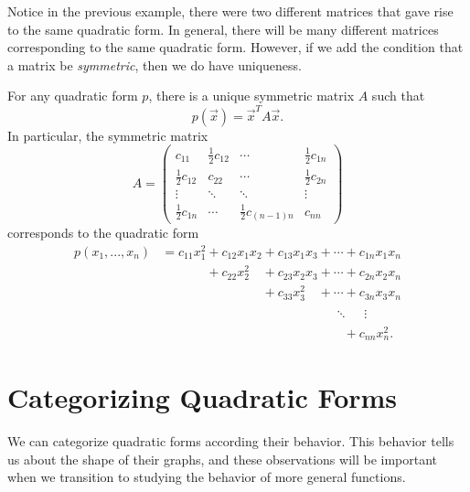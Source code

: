 \documentclass{ximera}
\begin{document}
Notice in the previous example, there were two different matrices that gave rise to the same quadratic form. In general, there will be many different matrices corresponding to the same quadratic form. However, if we add the condition that a matrix be \emph{symmetric}, then we do have uniqueness.

\begin{theorem}
For any quadratic form $p$, there is a unique symmetric matrix $A$ such that
\[
p(\vec{x}) = \vec{x}^T A \vec{x}.
\]
In particular, the symmetric matrix
\[
A = \begin{pmatrix}
c_{11} & \frac{1}{2}c_{12} & \cdots & \frac{1}{2}c_{1n}\\
\frac{1}{2}c_{12} & c_{22} & \cdots & \frac{1}{2}c_{2n}\\
\vdots & \ddots & \ddots & \vdots\\
\frac{1}{2}c_{1n} & \cdots & \frac{1}{2}c_{(n-1)n} & c_{nn}
\end{pmatrix}
\]
corresponds to the quadratic form
\begin{align*}
p(x_1,...,x_n) &= c_{11}x_1^2+c_{12}x_1x_2+c_{13}x_1x_3 + \cdots + c_{1n}x_1x_n\\
&\phantom{= c_{11}x_1^2}+c_{22}x_2^2\phantom{x_2}+c_{23}x_2x_3 + \cdots + c_{2n}x_2x_n\\
&\phantom{= c_{11}x_1^2+c_{12}x_1x_2}+c_{33}x_3^2\phantom{x_3} + \cdots + c_{3n}x_3x_n\\
&\phantom{= c_{11}x_1^2+c_{12}x_1x_2+c_{13}x_1x_3 +} \ddots \phantom{+} \vdots\\
&\phantom{= c_{11}x_1^2+c_{12}x_1x_2+c_{13}x_1x_3 + \cdots }+ c_{nn}x_n^2.
\end{align*}
\end{theorem}

\section*{Categorizing Quadratic Forms}

We can categorize quadratic forms according their behavior. This behavior tells us about the shape of their graphs, and these observations will be important when we transition to studying the behavior of more general functions.
\end{document}
